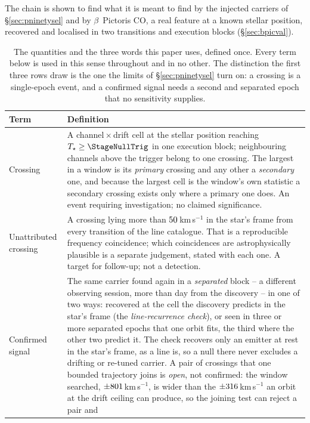 The chain is shown to find what it is meant to find by the injected carriers
of \S\ref{sec:pninetysel} and by $\beta$~Pictoris CO, a real feature at a
known stellar position, recovered and localised in two transitions and
\CsBpCoBlocks{} execution blocks (\S\ref{sec:bpicval}).


\begin{table}
\centering
\caption{The quantities and the three words this paper uses, defined once.
Every term below is used in this sense throughout and in no other. The
distinction the first three rows draw is the one the limits of
\S\ref{sec:pninetysel} turn on: a crossing is a single-epoch event, and a
confirmed signal needs a second and separated epoch that no sensitivity
supplies.}
\label{tab:quantities}
\small
\begin{tabular}{@{}p{}p{}@{}}
\hline
Term & Definition \\
\hline
Crossing &
A channel\,$\times$\,drift cell at the stellar position reaching
$T_\star\geq\StageNullTrig$ in one execution block; neighbouring channels
above the trigger belong to one crossing. The largest in a window is its
\emph{primary} crossing and any other a \emph{secondary} one, and because the
largest cell is the window's own statistic a secondary crossing exists only
where a primary one does. An event requiring investigation; no claimed
significance. \\
Unattributed crossing &
A crossing lying more than $50$\,km\,s$^{-1}$ in the star's frame
from every transition of the line catalogue. That is a reproducible frequency
coincidence; which coincidences are astrophysically plausible is a separate
judgement, stated with each one. A target for follow-up; not a detection. \\
Confirmed signal &
The same carrier found again in a \emph{separated} block -- a different
observing session, more than \EpSep{} day from the discovery -- in one of two
ways: recovered at the cell the discovery predicts in the star's frame (the
\emph{line-recurrence check}), or seen in three or more separated epochs that
one orbit fits, the third where the other two predict it. The check recovers
only an emitter at rest in the star's frame, as a line is, so a null there
never excludes a drifting or re-tuned carrier. A pair of crossings that one
bounded trajectory joins is \emph{open}, not confirmed: the window searched,
$\pm801$\,km\,s$^{-1}$, is wider than the $\pm316$\,km\,s$^{-1}$ an
orbit at the drift ceiling can produce, so the joining test can reject a pair and

\end{tabular}
\end{table}
